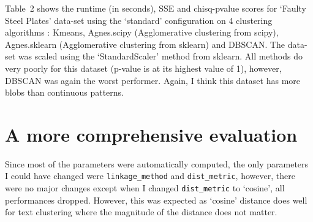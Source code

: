 \documentclass[12pt]{article}
\begin{document}
Table~2 shows the runtime (in seconds), SSE and chisq-pvalue scores for `Faulty Steel Plates' data-set using the `standard' configuration on 4 clustering algorithms : Kmeans, Agnes.scipy (Agglomerative clustering from scipy), Agnes.sklearn (Agglomerative clustering from sklearn) and DBSCAN. The data-set was scaled using the `StandardScaler' method from sklearn. All methods do very poorly for this dataset (p-value is at its highest value of 1), however, DBSCAN was again the worst performer. Again, I think this dataset has more blobs than continuous patterns.

\section*{A more comprehensive evaluation}

Since most of the parameters were automatically computed, the only parameters I could have changed were \texttt{linkage\_method} and \texttt{dist\_metric}, however, there were no major changes except when I changed \texttt{dist\_metric} to `cosine', all performances dropped. However, this was expected as `cosine' distance does well for text clustering where the magnitude of the distance does not matter.
\end{document}
